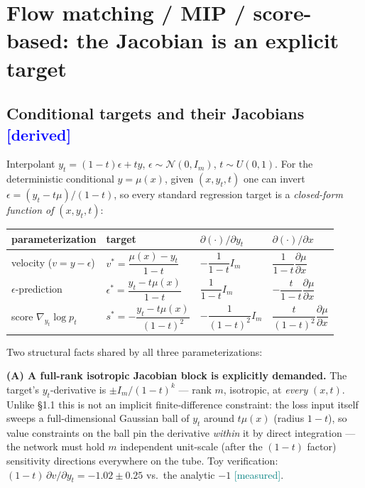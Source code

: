 \documentclass[10pt]{article}
\newcommand{\tagd}{{\small\textcolor{blue}{[derived]}}}
\newcommand{\tagm}{{\small\textcolor{teal}{[measured]}}}
\begin{document}
\section{Flow matching / MIP / score-based: the Jacobian is an explicit
target}

\subsection{Conditional targets and their Jacobians \hfill \tagd}
Interpolant $y_t = (1-t)\epsilon + t y$, $\epsilon\sim\mathcal N(0,I_m)$,
$t\sim U(0,1)$. For the deterministic conditional $y=\mu(x)$, given
$(x,y_t,t)$ one can invert $\epsilon = (y_t - t\mu)/(1-t)$, so every standard
regression target is a \emph{closed-form function of} $(x,y_t,t)$:
\begin{center}
\renewcommand{\arraystretch}{2.0}
\begin{tabular}{llll}
\toprule
parameterization & target & $\partial(\cdot)/\partial y_t$ &
$\partial(\cdot)/\partial x$ \\
\midrule
velocity ($v=y-\epsilon$) & $v^{*}=\dfrac{\mu(x)-y_t}{1-t}$ &
$-\dfrac{1}{1-t}I_m$ & $\dfrac{1}{1-t}\dfrac{\partial\mu}{\partial x}$ \\
$\epsilon$-prediction & $\epsilon^{*}=\dfrac{y_t - t\mu(x)}{1-t}$ &
$\dfrac{1}{1-t}I_m$ & $-\dfrac{t}{1-t}\dfrac{\partial\mu}{\partial x}$ \\
score $\nabla_{y_t}\log p_t$ & $s^{*}=-\dfrac{y_t-t\mu(x)}{(1-t)^{2}}$ &
$-\dfrac{1}{(1-t)^{2}}I_m$ &
$\dfrac{t}{(1-t)^{2}}\dfrac{\partial\mu}{\partial x}$ \\
\bottomrule
\end{tabular}
\end{center}

Two structural facts shared by all three parameterizations:

\textbf{(A) A full-rank isotropic Jacobian block is explicitly demanded.}
The target's $y_t$-derivative is $\pm I_m/(1-t)^{k}$ --- rank $m$, isotropic,
at \emph{every} $(x,t)$. Unlike \S1.1 this is not an implicit
finite-difference constraint: the loss input itself sweeps a full-dimensional
Gaussian ball of $y_t$ around $t\mu(x)$ (radius $1-t$), so value constraints
on the ball pin the derivative \emph{within} it by direct integration --- the
network must hold $m$ independent unit-scale (after the $(1-t)$ factor)
sensitivity directions everywhere on the tube. Toy verification:
$(1-t)\,\partial v/\partial y_t = -1.02\pm0.25$ vs.\ the analytic $-1$ \tagm.
\end{document}
